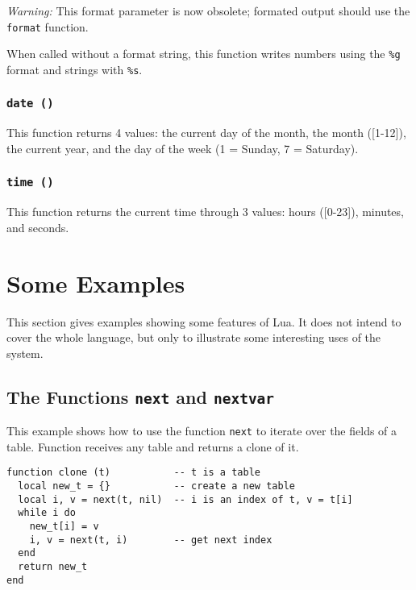 {\em Warning:}
This format parameter is now obsolete;
formated output should use the \verb'format' function.

When called without a format string,
this function writes numbers using the \verb'%g' format
and strings with \verb'%s'.

\subsubsection*{{\tt date ()}}

This function returns 4 values:
the current day of the month,
the month ([1-12]), the current year,
and the day of the week (1 = Sunday, 7 = Saturday).

\subsubsection*{{\tt time ()}}

This function returns the current time through 3 values:
hours ([0-23]), minutes, and seconds.



\section{Some Examples}

This section gives examples showing some features of Lua.
It does not intend to cover the whole language,
but only to illustrate some interesting uses of the system.


\subsection{The Functions {\tt next} and {\tt nextvar}} \label{exnext}
This example shows how to use the function \verb'next' to iterate
over the fields of a table.
Function  receives any table and returns a clone of it.
\begin{verbatim}
function clone (t)           -- t is a table
  local new_t = {}           -- create a new table
  local i, v = next(t, nil)  -- i is an index of t, v = t[i]
  while i do
    new_t[i] = v
    i, v = next(t, i)        -- get next index
  end
  return new_t
end
\end{verbatim}

